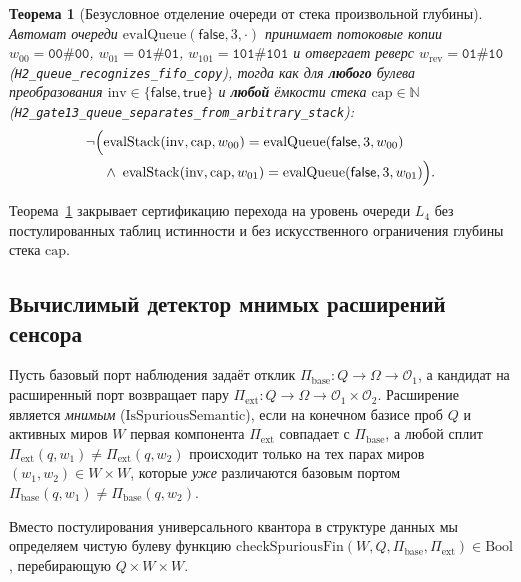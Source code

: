 \documentclass[11pt,a4paper]{article}
\theoremstyle{cleanthm}
\newtheorem{theorem}{Теорема}[section]
\theoremstyle{cleandef}
\begin{document}
\begin{theorem}[Безусловное отделение очереди от стека произвольной глубины]
\label{thm:h2_queue_vs_stack}
Автомат очереди $\mathrm{evalQueue}(\mathsf{false},3,\cdot)$ принимает потоковые копии $w_{00}=\mathtt{00\#00}$, $w_{01}=\mathtt{01\#01}$, $w_{101}=\mathtt{101\#101}$ и отвергает реверс $w_{\mathrm{rev}}=\mathtt{01\#10}$ (\texttt{H2\_queue\_\allowbreak recognizes\_\allowbreak fifo\_\allowbreak copy}), тогда как для \textbf{любого} булева преобразования $\mathrm{inv}\in\{\mathsf{false},\mathsf{true}\}$ и \textbf{любой} ёмкости стека $\mathrm{cap}\in\mathbb{N}$ (\texttt{H2\_gate13\_\allowbreak queue\_\allowbreak separates\_\allowbreak from\_\allowbreak arbitrary\_\allowbreak stack}):
\begin{equation}
  \neg\begin{aligned}[t]
    \Bigl(&\mathrm{evalStack}(\mathrm{inv},\mathrm{cap},w_{00}) = \mathrm{evalQueue}(\mathsf{false},3,w_{00}) \\
          &\land\; \mathrm{evalStack}(\mathrm{inv},\mathrm{cap},w_{01}) = \mathrm{evalQueue}(\mathsf{false},3,w_{01})\Bigr).
  \end{aligned}
\end{equation}
\end{theorem}

Теорема~\ref{thm:h2_queue_vs_stack} закрывает сертификацию перехода на уровень очереди $L_4$ без постулированных таблиц истинности и без искусственного ограничения глубины стека $\mathrm{cap}$.

\subsection{Вычислимый детектор мнимых расширений сенсора}

Пусть базовый порт наблюдения задаёт отклик $\Pi_{\mathrm{base}}:Q\to\Omega\to\mathcal{O}_1$, а кандидат на расширенный порт возвращает пару $\Pi_{\mathrm{ext}}:Q\to\Omega\to\mathcal{O}_1\times\mathcal{O}_2$. Расширение является \emph{мнимым} ($\mathrm{IsSpuriousSemantic}$), если на конечном базисе проб $Q$ и активных миров $W$ первая компонента $\Pi_{\mathrm{ext}}$ совпадает с $\Pi_{\mathrm{base}}$, а любой сплит $\Pi_{\mathrm{ext}}(q,w_1)\ne\Pi_{\mathrm{ext}}(q,w_2)$ происходит только на тех парах миров $(w_1,w_2)\in W\times W$, которые \emph{уже} различаются базовым портом $\Pi_{\mathrm{base}}(q,w_1)\ne\Pi_{\mathrm{base}}(q,w_2)$.

Вместо постулирования универсального квантора в структуре данных мы определяем чистую булеву функцию $\mathrm{checkSpuriousFin}(W,Q,\Pi_{\mathrm{base}},\Pi_{\mathrm{ext}})\in\mathrm{Bool}$, перебирающую $Q\times W\times W$.
\end{document}
